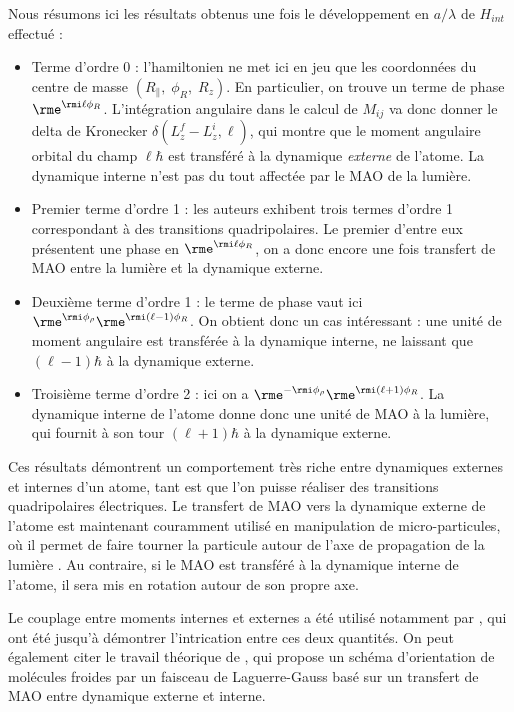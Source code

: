Nous résumons ici les résultats obtenus une fois le développement en $a/\lambda$ de $H_{int}$ effectué :
\begin{itemize}
\item Terme d'ordre 0 : l'hamiltonien ne met ici en jeu que les coordonnées du centre de masse $(R_{\parallel},\;\phi_R,\;R_z)$. En particulier, on trouve un terme de phase $\rme^{\rmi\ell\phi_R}$. L'intégration angulaire dans le calcul de $M_{ij}$ va donc donner le delta de Kronecker $\delta(L^f_z-L^i_z,\ell)$, qui montre que le moment angulaire orbital du champ $\ell\hbar$ est transféré à la dynamique \textit{externe} de l'atome. La dynamique interne n'est pas du tout affectée par le MAO de la lumière.\\

\item Premier terme d'ordre 1 : les auteurs exhibent trois termes d'ordre 1 correspondant à des transitions quadripolaires. Le premier d'entre eux présentent une phase en $\rme^{\rmi\ell\phi_R}$, on a donc encore une fois transfert de MAO entre la lumière et la dynamique externe.\\

\item Deuxième terme d'ordre 1 : le terme de phase vaut ici $\rme^{\rmi\phi_\rho}\rme^{\rmi(\ell-1)\phi_R}$. On obtient donc un cas intéressant : une unité de moment angulaire est transférée à la dynamique interne, ne laissant que $(\ell-1)\hbar$ à la dynamique externe.\\

\item Troisième terme d'ordre 2 : ici on a $\rme^{-\rmi\phi_\rho}\rme^{\rmi(\ell+1)\phi_R}$. La dynamique interne de l'atome donne donc une unité de MAO à la lumière, qui fournit à son tour $(\ell+1)\hbar$ à la dynamique externe.\\
\end{itemize}

Ces résultats démontrent un comportement très riche entre dynamiques externes et internes d'un atome, tant est que l'on puisse réaliser des transitions quadripolaires électriques. Le transfert de MAO vers la dynamique externe de l'atome est maintenant couramment utilisé en manipulation de micro-particules, où il permet de faire tourner la particule autour de l'axe de propagation de la lumière . Au contraire, si le MAO est transféré à la dynamique interne de l'atome, il sera mis en rotation autour de son propre axe.\par
Le couplage entre moments internes et externes a été utilisé notamment par , qui ont été jusqu'à démontrer l'intrication entre ces deux quantités. On peut également citer le travail théorique de , qui propose un schéma d'orientation de molécules froides par un faisceau de Laguerre-Gauss basé sur un transfert de MAO entre dynamique externe et interne.

